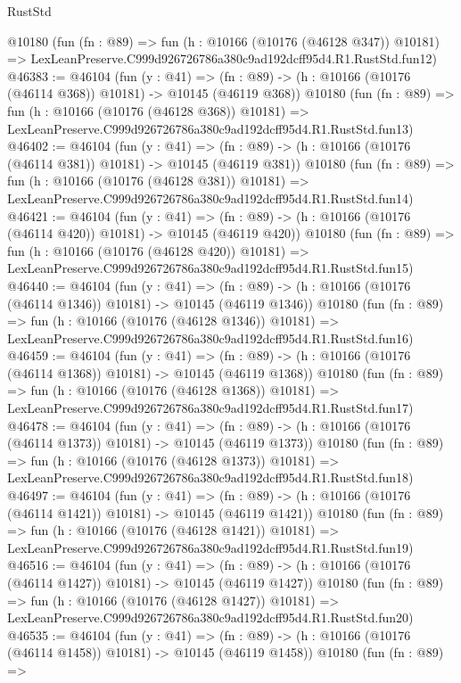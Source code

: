 \begin{lexlean}{RustStd}
\begin{coremodule}
    @10180
    (fun (fn : @89) =>
    fun (h : @10166 (@10176 (@46128 @347)) @10181) =>
    LexLeanPreserve.C999d926726786a380c9ad192dcff95d4.R1.RustStd.fun12)
@46383 := @46104
    (fun (y : @41) =>
    (fn : @89) -> (h : @10166 (@10176 (@46114 @368)) @10181) -> @10145 (@46119 @368))
    @10180
    (fun (fn : @89) =>
    fun (h : @10166 (@10176 (@46128 @368)) @10181) =>
    LexLeanPreserve.C999d926726786a380c9ad192dcff95d4.R1.RustStd.fun13)
@46402 := @46104
    (fun (y : @41) =>
    (fn : @89) -> (h : @10166 (@10176 (@46114 @381)) @10181) -> @10145 (@46119 @381))
    @10180
    (fun (fn : @89) =>
    fun (h : @10166 (@10176 (@46128 @381)) @10181) =>
    LexLeanPreserve.C999d926726786a380c9ad192dcff95d4.R1.RustStd.fun14)
@46421 := @46104
    (fun (y : @41) =>
    (fn : @89) -> (h : @10166 (@10176 (@46114 @420)) @10181) -> @10145 (@46119 @420))
    @10180
    (fun (fn : @89) =>
    fun (h : @10166 (@10176 (@46128 @420)) @10181) =>
    LexLeanPreserve.C999d926726786a380c9ad192dcff95d4.R1.RustStd.fun15)
@46440 := @46104
    (fun (y : @41) =>
    (fn : @89) -> (h : @10166 (@10176 (@46114 @1346)) @10181) -> @10145 (@46119 @1346))
    @10180
    (fun (fn : @89) =>
    fun (h : @10166 (@10176 (@46128 @1346)) @10181) =>
    LexLeanPreserve.C999d926726786a380c9ad192dcff95d4.R1.RustStd.fun16)
@46459 := @46104
    (fun (y : @41) =>
    (fn : @89) -> (h : @10166 (@10176 (@46114 @1368)) @10181) -> @10145 (@46119 @1368))
    @10180
    (fun (fn : @89) =>
    fun (h : @10166 (@10176 (@46128 @1368)) @10181) =>
    LexLeanPreserve.C999d926726786a380c9ad192dcff95d4.R1.RustStd.fun17)
@46478 := @46104
    (fun (y : @41) =>
    (fn : @89) -> (h : @10166 (@10176 (@46114 @1373)) @10181) -> @10145 (@46119 @1373))
    @10180
    (fun (fn : @89) =>
    fun (h : @10166 (@10176 (@46128 @1373)) @10181) =>
    LexLeanPreserve.C999d926726786a380c9ad192dcff95d4.R1.RustStd.fun18)
@46497 := @46104
    (fun (y : @41) =>
    (fn : @89) -> (h : @10166 (@10176 (@46114 @1421)) @10181) -> @10145 (@46119 @1421))
    @10180
    (fun (fn : @89) =>
    fun (h : @10166 (@10176 (@46128 @1421)) @10181) =>
    LexLeanPreserve.C999d926726786a380c9ad192dcff95d4.R1.RustStd.fun19)
@46516 := @46104
    (fun (y : @41) =>
    (fn : @89) -> (h : @10166 (@10176 (@46114 @1427)) @10181) -> @10145 (@46119 @1427))
    @10180
    (fun (fn : @89) =>
    fun (h : @10166 (@10176 (@46128 @1427)) @10181) =>
    LexLeanPreserve.C999d926726786a380c9ad192dcff95d4.R1.RustStd.fun20)
@46535 := @46104
    (fun (y : @41) =>
    (fn : @89) -> (h : @10166 (@10176 (@46114 @1458)) @10181) -> @10145 (@46119 @1458))
    @10180
    (fun (fn : @89) =>

\end{coremodule}
\end{lexlean}
